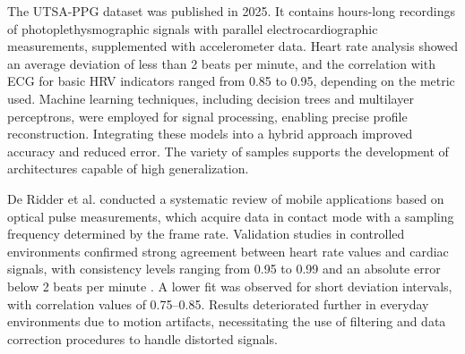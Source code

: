 \documentclass[journal]{IEEEtran}
\begin{document}
The UTSA-PPG dataset \cite{18} was published in 2025. It contains hours-long recordings of photoplethysmographic signals with parallel electrocardiographic measurements, supplemented with accelerometer data. Heart rate analysis showed an average deviation of less than 2 beats per minute, and the correlation with ECG for basic HRV indicators ranged from 0.85 to 0.95, depending on the metric used. Machine learning techniques, including decision trees and multilayer perceptrons, were employed for signal processing, enabling precise profile reconstruction. Integrating these models into a hybrid approach improved accuracy and reduced error. The variety of samples supports the development of architectures capable of high generalization.

\newpage
De Ridder et al. \cite{19} conducted a systematic review of mobile applications based on optical pulse measurements, which acquire data in contact mode with a sampling frequency determined by the frame rate. Validation studies in controlled environments confirmed strong agreement between heart rate values and cardiac signals, with consistency levels ranging from 0.95 to 0.99 and an absolute error below 2 beats per minute \cite{20}. A lower fit was observed for short deviation intervals, with correlation values of 0.75–0.85. Results deteriorated further in everyday environments due to motion artifacts, necessitating the use of filtering and data correction procedures to handle distorted signals.
\end{document}
